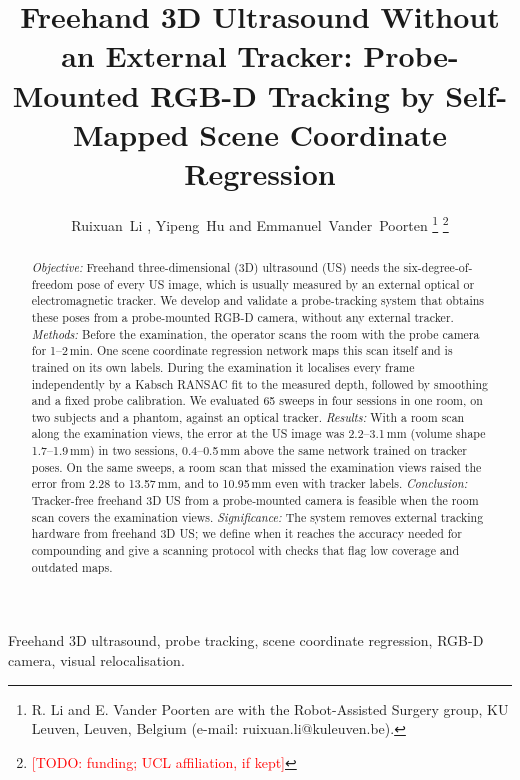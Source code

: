 \documentclass[journal]{IEEEtran}
\newcommand{\tbd}[1]{\textcolor{red}{[TODO: #1]}}
\begin{document}
\title{Freehand 3D Ultrasound Without an External Tracker: Probe-Mounted RGB-D Tracking by Self-Mapped Scene Coordinate Regression}

\author{Ruixuan~Li , Yipeng~Hu and Emmanuel~Vander~Poorten%
\thanks{R. Li and E. Vander Poorten are with the Robot-Assisted Surgery group, KU Leuven, Leuven, Belgium (e-mail: ruixuan.li@kuleuven.be).}%
\thanks{\tbd{funding; UCL affiliation, if kept}}}


\maketitle

\begin{abstract}
\emph{Objective:} Freehand three-dimensional (3D) ultrasound (US) needs the six-degree-of-freedom pose of every US image, which is usually measured by an external optical or electromagnetic tracker. We develop and validate a probe-tracking system that obtains these poses from a probe-mounted RGB-D camera, without any external tracker. \emph{Methods:} Before the examination, the operator scans the room with the probe camera for 1--2\,min. One scene coordinate regression network maps this scan itself and is trained on its own labels. During the examination it localises every frame independently by a Kabsch RANSAC fit to the measured depth, followed by smoothing and a fixed probe calibration. We evaluated 65 sweeps in four sessions in one room, on two subjects and a phantom, against an optical tracker. \emph{Results:} With a room scan along the examination views, the error at the US image was 2.2--3.1\,mm (volume shape 1.7--1.9\,mm) in two sessions, 0.4--0.5\,mm above the same network trained on tracker poses. On the same sweeps, a room scan that missed the examination views raised the error from 2.28 to 13.57\,mm, and to 10.95\,mm even with tracker labels. \emph{Conclusion:} Tracker-free freehand 3D US from a probe-mounted camera is feasible when the room scan covers the examination views. \emph{Significance:} The system removes external tracking hardware from freehand 3D US; we define when it reaches the accuracy needed for compounding and give a scanning protocol with checks that flag low coverage and outdated maps.
\end{abstract}

\begin{IEEEkeywords}
Freehand 3D ultrasound, probe tracking, scene coordinate regression, RGB-D camera, visual relocalisation.
\end{IEEEkeywords}
\end{document}
